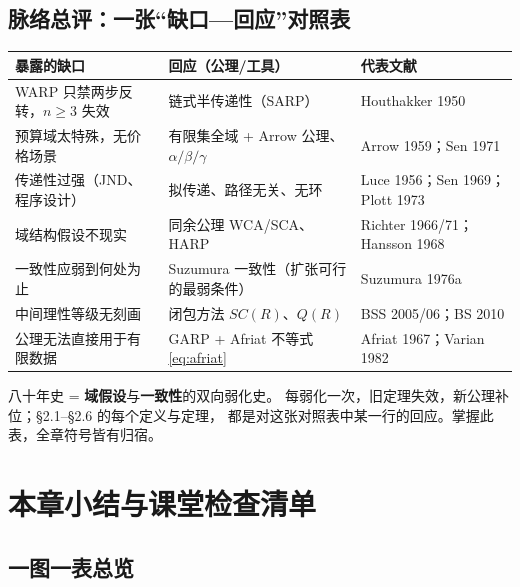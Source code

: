 \subsection{脉络总评：一张“缺口—回应”对照表}

\begin{center}
\small
\begin{tabular}{p{4.6cm}p{4.2cm}p{4.4cm}}
\toprule
\textbf{暴露的缺口} & \textbf{回应（公理/工具）} & \textbf{代表文献} \\
\midrule
WARP 只禁两步反转，$n\ge3$ 失效 & 链式半传递性（SARP） & Houthakker 1950 \\
预算域太特殊，无价格场景 & 有限集全域 + Arrow 公理、$\alpha/\beta/\gamma$ & Arrow 1959；Sen 1971 \\
传递性过强（JND、程序设计） & 拟传递、路径无关、无环 & Luce 1956；Sen 1969；Plott 1973 \\
域结构假设不现实 & 同余公理 WCA/SCA、HARP & Richter 1966/71；Hansson 1968 \\
一致性应弱到何处为止 & Suzumura 一致性（扩张可行的最弱条件） & Suzumura 1976a \\
中间理性等级无刻画 & 闭包方法 $SC(R)$、$Q(R)$ & BSS 2005/06；BS 2010 \\
公理无法直接用于有限数据 & GARP + Afriat 不等式 \eqref{eq:afriat} & Afriat 1967；Varian 1982 \\
\bottomrule
\end{tabular}
\end{center}

\begin{remark}[一句话总评]
八十年史 = \textbf{域假设}与\textbf{一致性}的双向弱化史。
每弱化一次，旧定理失效，新公理补位；§2.1--§2.6 的每个定义与定理，
都是对这张对照表中某一行的回应。掌握此表，全章符号皆有归宿。
\end{remark}

\section{本章小结与课堂检查清单}

\subsection{一图一表总览}

